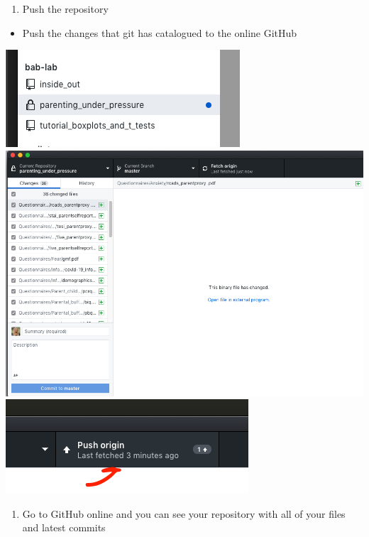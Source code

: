 \documentclass[]{book}
\providecommand{\tightlist}{%
  \setlength{\itemsep}{0pt}\setlength{\parskip}{0pt}}
\begin{document}
\begin{enumerate}
\def\labelenumi{\arabic{enumi}.}
\setcounter{enumi}{7}
\tightlist
\item
  Push the repository
\end{enumerate}

\begin{itemize}
\tightlist
\item
  Push the changes that git has catalogued to the online GitHub
\end{itemize}

\includegraphics{images/research_protocols/github/9.png}
\includegraphics{images/research_protocols/github/10.png}
\includegraphics{images/research_protocols/github/12.png}

\begin{enumerate}
\def\labelenumi{\arabic{enumi}.}
\setcounter{enumi}{8}
\tightlist
\item
  Go to GitHub online and you can see your repository with all of your files and latest commits
\end{enumerate}
\end{document}
